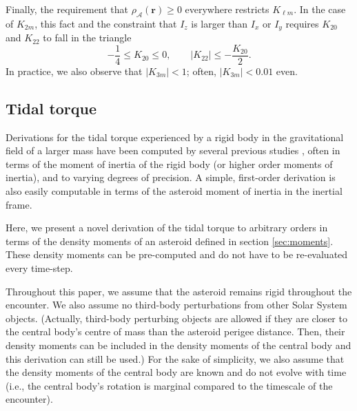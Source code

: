 Finally, the requirement that $\rho_\mathcal{A}(\bm r) \geq 0$ everywhere restricts $K_{\ell m}$. In the case of $K_{2m}$, this fact and the constraint that $I_z$ is larger than $I_x$ or $I_y$ requires $K_{20}$ and $K_{22}$ to fall in the triangle
\begin{equation}
  -\frac{1}{4} \leq K_{20} \leq 0, \qquad |K_{22}| \leq -\frac{K_{20}}{2}.
  \label{eqn:parameter-bounds}
\end{equation}
In practice, we also observe that $|K_{3m}| < 1$; often, $|K_{3m}| < 0.01$ even.





\subsection{Tidal torque}
\label{sec:tidal-torque}

Derivations for the tidal torque experienced by a rigid body in the gravitational field of a larger mass have been computed by several previous studies \cite{paul88,HouMar2017,BOUE2009750, ashenberg07}, often in terms of the moment of inertia of the rigid body (or higher order moments of inertia), and to varying degrees of precision. A simple, first-order derivation is also easily computable in terms of the asteroid moment of inertia in the inertial frame.

Here, we present a novel derivation of the tidal torque to arbitrary orders in terms of the density moments of an asteroid defined in section \ref{sec:moments}. These density moments can be pre-computed and do not have to be re-evaluated every time-step.

Throughout this paper, we assume that the asteroid remains rigid throughout the encounter. We also assume no third-body perturbations from other Solar System objects. (Actually, third-body perturbing objects are allowed if they are closer to the central body's centre of mass than the asteroid perigee distance. Then, their density moments can be included in the density moments of the central body and this derivation can still be used.) For the sake of simplicity, we also assume that the density moments of the central body are known and do not evolve with time (i.e., the central body's rotation is marginal compared to the timescale of the encounter).

